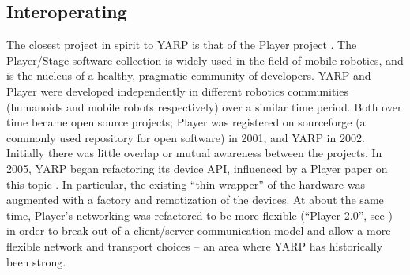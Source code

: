 








\subsection{Interoperating}

\label{sect:interop}

The closest project in spirit to YARP is that of the Player project
\cite{vaughan2006reusable}.  
%
%
The Player/Stage software collection is 
widely used in the field of mobile robotics, and is the nucleus of
a healthy, pragmatic community of developers.  
%
YARP and Player were developed
independently in different robotics communities (humanoids and mobile
robots respectively) over a similar time period.  Both over time
became open source projects; Player was registered on sourceforge (a
commonly used repository for open software) in 2001, and YARP in 2002.
Initially there was little overlap or mutual awareness between the
projects.  In 2005, YARP began refactoring its device API, influenced 
by a Player paper on this topic \cite{vaughan2003device}. In particular,
the existing ``thin wrapper'' of the hardware was augmented with
a factory and remotization of the devices.
At about the same time, Player's networking was refactored to be
more flexible (``Player 2.0'', see \cite{collett2005player}) in 
order to break out of a client/server communication model and
allow a more flexible network and transport choices -- an area where 
YARP has historically been strong.  

